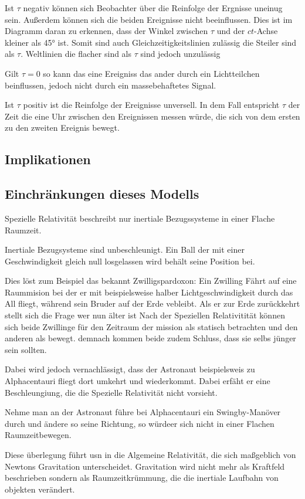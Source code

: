 \documentclass[12pt]{article}
\begin{document}
Ist $\tau$ negativ können sich Beobachter über die Reinfolge der Ergnisse uneinug sein.
Außerdem können sich die beiden Ereignisse nicht beeinflussen.
Dies ist im Diagramm daran zu erkennen, dass der Winkel zwischen $\tau$ und der $ct$-Achse kleiner als \ang{45} ist.
Somit sind auch Gleichzeitigkeitslinien zulässig die Steiler sind als $\tau$.
Weltlinien die flacher sind als $\tau$ sind jedoch unzulässig

Gilt $\tau = 0$ so kann das eine Ereigniss das ander durch ein Lichtteilchen beinflussen, jedoch nicht durch ein massebehaftetes Signal.

Ist $\tau$ positiv ist die Reinfolge der Ereignisse unversell.
In dem Fall entspricht $\tau$ der Zeit die eine Uhr zwischen den Ereignissen messen würde, die sich von dem ersten zu den zweiten Ereignis bewegt.
\subsection{Implikationen}
\subsection{Einchränkungen dieses Modells}
Spezielle Relativität beschreibt nur inertiale Bezugssysteme in einer Flache Raumzeit.

Inertiale Bezugsysteme sind unbeschleunigt.
Ein Ball der mit einer Geschwindigkeit gleich null losgelassen wird behält seine Position bei.

Dies löst zum Beispiel das bekannt Zwilligspardoxon:
Ein Zwilling Fährt auf eine Raummision bei der er mit beispielsweise halber Lichtgeschwindigkeit durch das All fliegt, während sein Bruder auf der Erde vebleibt.
Als er zur Erde zurückkehrt stellt sich die Frage wer nun älter ist
Nach der Speziellen Relativitität können sich beide Zwillinge für den Zeitraum der mission als statisch betrachten und den anderen als bewegt.
demnach kommen beide zudem Schluss, dass sie selbs jünger sein sollten.

Dabei wird jedoch vernachlässigt, dass der Astronaut beispielsweis zu Alphacentauri fliegt dort umkehrt und wiederkommt.
Dabei erfäht er eine Beschleungiung, die die Spezielle Relativität nicht vorsieht.

Nehme man an der Astronaut führe bei Alphacentauri ein Swingby-Manöver durch und ändere so seine Richtung, so würdeer sich nicht in einer Flachen Raumzeitbewegen.

Diese überlegung führt usn in die Algemeine Relativität, die sich maßgeblich von Newtons Gravitation unterscheidet.
Gravitation wird nicht mehr als Kraftfeld beschrieben sondern als Raumzeitkrümmung, die die inertiale Laufbahn von objekten verändert.
\end{document}
